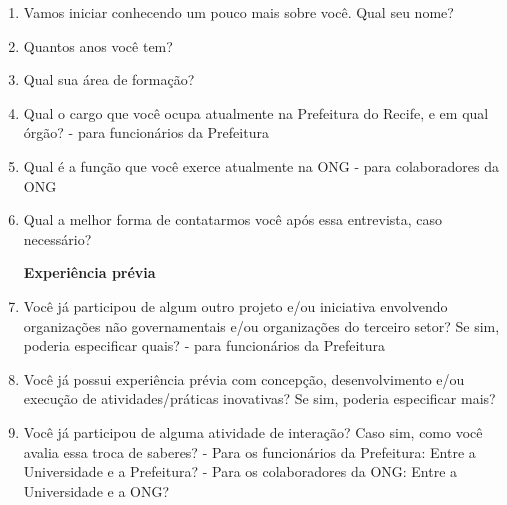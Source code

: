 \begin{enumerate}
    \item Vamos iniciar conhecendo um pouco mais sobre você. Qual seu nome?
    \item Quantos anos você tem?
    \item Qual sua área de formação?
    \item Qual o cargo que você ocupa atualmente na Prefeitura do Recife, e em qual órgão? - para funcionários da Prefeitura
    \item Qual é a função que você exerce atualmente na \gls{ONG} - para colaboradores da \gls{ONG}
    \item Qual a melhor forma de contatarmos você após essa entrevista, caso necessário?
\par\vspace{1\baselineskip}
\textbf{Experiência prévia}
    \item Você já participou de algum outro projeto e/ou iniciativa envolvendo organizações não governamentais e/ou organizações do terceiro setor? Se sim, poderia especificar quais? - para funcionários da Prefeitura
    \item Você já possui experiência prévia com concepção, desenvolvimento e/ou execução de atividades/práticas inovativas? Se sim, poderia especificar mais?
    \item Você já participou de alguma atividade de interação? Caso sim, como você avalia essa troca de saberes?
    - Para os funcionários da Prefeitura: Entre a Universidade e a Prefeitura?
    - Para os colaboradores da \gls{ONG}: Entre a Universidade e a ONG?


\end{enumerate}
